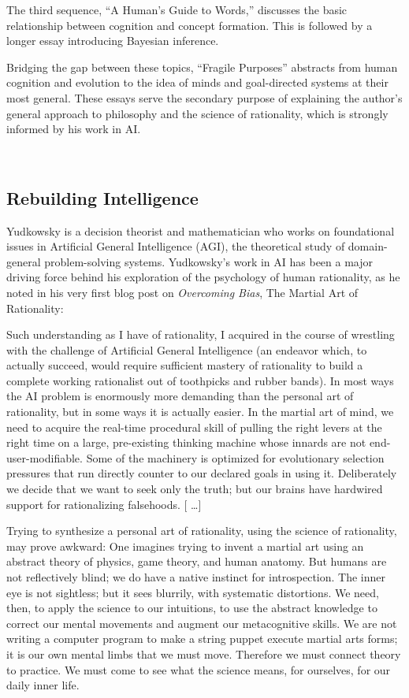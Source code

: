 {
 The third sequence, ``A Human's
Guide to Words,'' discusses the basic relationship
between cognition and concept formation. This is followed by a longer
essay introducing Bayesian inference.}

{
 Bridging the gap between these topics, ``Fragile
Purposes'' abstracts from human cognition and
evolution to the idea of minds and goal-directed systems at their most
general. These essays serve the secondary purpose of explaining the
author's general approach to philosophy and the science
of rationality, which is strongly informed by his work in AI.}

{
 ~}

\subsection{Rebuilding Intelligence}

{
 Yudkowsky is a decision theorist and mathematician who works on
foundational issues in Artificial General Intelligence (AGI), the
theoretical study of domain-general problem-solving systems.
Yudkowsky's work in AI has been a major driving force
behind his exploration of the psychology of human rationality, as he
noted in his very first blog post on \textit{Overcoming Bias}, The
Martial Art of Rationality:}

{
 Such understanding as I have of rationality, I acquired in the
course of wrestling with the challenge of Artificial General
Intelligence (an endeavor which, to actually succeed, would require
sufficient mastery of rationality to build a complete working
rationalist out of toothpicks and rubber bands). In most ways the AI
problem is enormously more demanding than the personal art of
rationality, but in some ways it is actually easier. In the martial art
of mind, we need to acquire the real-time procedural skill of pulling
the right levers at the right time on a large, pre-existing thinking
machine whose innards are not end-user-modifiable. Some of the
machinery is optimized for evolutionary selection pressures that run
directly counter to our declared goals in using it. Deliberately we
decide that we want to seek only the truth; but our brains have
hardwired support for rationalizing falsehoods. [ \ldots ]}

{
 Trying to synthesize a personal art of rationality, using the
science of rationality, may prove awkward: One imagines trying to
invent a martial art using an abstract theory of physics, game theory,
and human anatomy. But humans are not reflectively blind; we do have a
native instinct for introspection. The inner eye is not sightless; but
it sees blurrily, with systematic distortions. We need, then, to apply
the science to our intuitions, to use the abstract knowledge to correct
our mental movements and augment our metacognitive skills. We are not
writing a computer program to make a string puppet execute martial arts
forms; it is our own mental limbs that we must move. Therefore we must
connect theory to practice. We must come to see what the science means,
for ourselves, for our daily inner life.}

